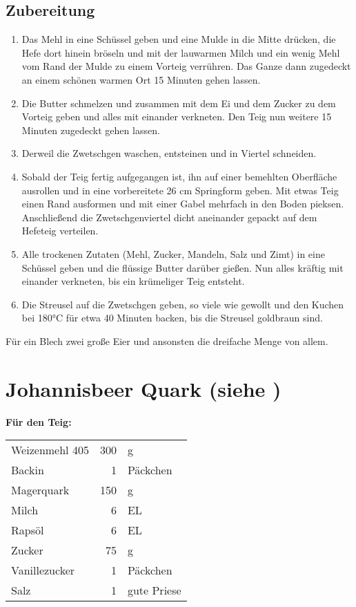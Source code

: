 \subsection*{Zubereitung}

\begin{enumerate}
	\item Das Mehl in eine Schüssel geben und eine Mulde in die Mitte drücken, die Hefe dort hinein bröseln und mit der lauwarmen Milch und ein wenig Mehl vom Rand der Mulde zu einem Vorteig verrühren. Das Ganze dann zugedeckt an einem schönen warmen Ort 15 Minuten gehen lassen.
	\item Die Butter schmelzen und zusammen mit dem Ei und dem Zucker zu dem Vorteig geben und alles mit einander verkneten. Den Teig nun weitere 15 Minuten zugedeckt gehen lassen.
	\item Derweil die Zwetschgen waschen, entsteinen und in Viertel schneiden.
	\item Sobald der Teig fertig aufgegangen ist, ihn auf einer bemehlten Oberfläche ausrollen und in eine vorbereitete 26 cm Springform geben. Mit etwas Teig einen Rand ausformen und mit einer Gabel mehrfach in den Boden pieksen. Anschließend die Zwetschgenviertel dicht aneinander gepackt auf dem Hefeteig verteilen.
	\item Alle trockenen Zutaten (Mehl, Zucker, Mandeln, Salz und Zimt) in eine Schüssel geben und die flüssige Butter darüber gießen. Nun alles kräftig mit einander verkneten, bis ein krümeliger Teig entsteht.
	\item Die Streusel auf die Zwetschgen geben, so viele wie gewollt und den Kuchen bei 180°C für etwa 40 Minuten backen, bis die Streusel goldbraun sind.
\end{enumerate}

Für ein Blech zwei große Eier und ansonsten die dreifache Menge von allem.

\section[Johannisbeer Quark ]{Johannisbeer Quark \textmd{(siehe \cite[172]{OetkerBackenMachtFreude1992})}}
\textbf{Für den Teig:\\}
\begin{tabular}{lrl}
    Weizenmehl 405 & 300 &          g \\
    Backin         &   1 &   Päckchen \\
    Magerquark     & 150 &          g \\
    Milch          &   6 &         EL \\
    Rapsöl         &   6 &         EL \\
    Zucker         &  75 &          g \\
    Vanillezucker  &   1 &   Päckchen \\
    Salz           &   1 & gute Priese
\end{tabular} 

